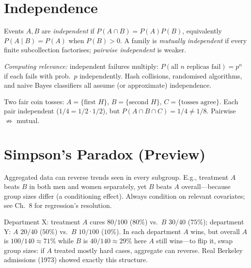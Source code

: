 \section{Independence}
\label{sec:independence}

\begin{definition}[Independence] Events $A,B$ are \emph{independent} if $P(A\cap B)=P(A)P(B)$, equivalently $P(A\mid B)=P(A)$ when $P(B)>0$. A family is \emph{mutually independent} if every finite subcollection factorises; \emph{pairwise independent} is weaker.
\end{definition}

\emph{Computing relevance:} independent failures multiply: $P(\text{all $n$ replicas fail})=p^n$ if each fails with prob.\ $p$ independently. Hash collisions, randomised algorithms, and naive Bayes classifiers all assume (or approximate) independence.

\begin{example} Two fair coin tosses: $A=\{\text{first }H\}$, $B=\{\text{second }H\}$, $C=\{\text{tosses agree}\}$. Each pair independent ($1/4=1/2\cdot1/2$), but $P(A\cap B\cap C)=1/4\ne1/8$. Pairwise $\not\Rightarrow$ mutual.
\end{example}

\section{Simpson's Paradox (Preview)}
Aggregated data can reverse trends seen in every subgroup. E.g., treatment $A$ beats $B$ in both men and women separately, yet $B$ beats $A$ overall---because group sizes differ (a conditioning effect). Always condition on relevant covariates; see Ch.~8 for regression's resolution.

\begin{example} Department X: treatment $A$ cures $80/100$ ($80\%$) vs.\ $B$ $30/40$ ($75\%$); department Y: $A$ $20/40$ ($50\%$) vs.\ $B$ $10/100$ ($10\%$). In each department $A$ wins, but overall $A$ is $100/140\approx71\%$ while $B$ is $40/140\approx29\%$ here $A$ still wins---to flip it, swap group sizes: if $A$ treated mostly hard cases, aggregate can reverse. Real Berkeley admissions (1973) showed exactly this structure.
\end{example}

